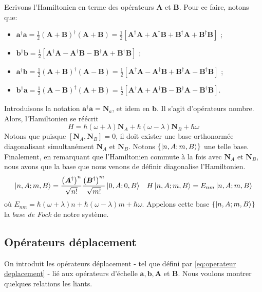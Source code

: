 \documentclass[11pt,oneside,a4paper]{article}
\newcommand{\h}{\ensuremath{\hbar}}
\begin{document}
Ecrivons l'Hamiltonien en terme des opérateurs $\bm{A}$ et $\bm{B}$. Pour ce faire, notons que:
\begin{itemize}
  \item $\bm{a}^\dagger\bm{a} = \frac{1}{2}\left(\bm{A}+\bm{B}\right)^\dagger\left(\bm{A}+\bm{B}\right) = \frac{1}{2}\left[\bm{A}^\dagger\bm{A}+\bm{A}^\dagger\bm{B}+\bm{B}^\dagger\bm{A}+\bm{B}^\dagger\bm{B}\right]$ ;\\
  \item $\bm{b}^\dagger\bm{b} = \frac{1}{2}\left[\bm{A}^\dagger\bm{A}-\bm{A}^\dagger\bm{B}-\bm{B}^\dagger\bm{A}+\bm{B}^\dagger\bm{B}\right]$ ;
  \item $\bm{a}^\dagger\bm{b} = \frac{1}{2}\left(\bm{A}+\bm{B}\right)^\dagger\left(\bm{A}-\bm{B}\right) = \frac{1}{2}\left[\bm{A}^\dagger\bm{A}-\bm{A}^\dagger\bm{B}+\bm{B}^\dagger\bm{A}-\bm{B}^\dagger\bm{B}\right]$ ;\\
  \item $\bm{b}^\dagger\bm{a} = \frac{1}{2}\left(\bm{A}-\bm{B}\right)^\dagger\left(\bm{A}+\bm{B}\right) = \frac{1}{2}\left[\bm{A}^\dagger\bm{A}+\bm{A}^\dagger\bm{B}-\bm{B}^\dagger\bm{A}-\bm{B}^\dagger\bm{B}\right]$.
\end{itemize}
Introduisons la notation $\bm{a}^\dagger\bm{a} = \bm{N}_a$, et idem en $\bm{b}$. Il s'agit d'opérateurs nombre. Alors, l'Hamiltonien se réécrit
\begin{equation}
  H = \h\left(\omega+\lambda\right)\bm{N}_A+\h\left(\omega-\lambda\right)\bm{N}_B+\h\omega
\end{equation}
Notons que puisque $[\bm{N}_A,\bm{N}_B] = 0$, il doit exister une base orthonormée diagonalisant simultanément $\bm{N}_A$ et $\bm{N}_B$. Notons $\left\{\ket{n,A;m,B}\right\}$ une telle base. Finalement, en remarquant que l'Hamiltonien commute à la fois avec $\bm{N}_A$ et $\bm{N}_B$, nous avons que la base que nous venons de définir diagonalise l'Hamiltonien.
\begin{align*}
  \ket{n,A;m,B} &= \frac{\left(\bm{A}^\dagger\right)^n}{\sqrt{n!}}\frac{\left(\bm{B}^\dagger\right)^m}{\sqrt{m!}}\ket{0,A;0,B} &H\ket{n,A;m,B} = E_{nm}\ket{n,A;m,B}
\end{align*}
où $E_{nm} = \h\left(\omega+\lambda\right)n+\h\left(\omega-\lambda\right)m+\h\omega$. Appelons cette base $\left\{\ket{n,A;m,B}\right\}$ la \emph{base de Fock} de notre système.
\subsection{Opérateurs déplacement}
On introduit les opérateurs déplacement - tel que défini par \eqref{eq:operateur deplacement} - lié aux opérateurs d'échelle $\bm{a},\bm{b},\bm{A}$ et $\bm{B}$.
Nous voulons montrer quelques relations les liants.
\end{document}
